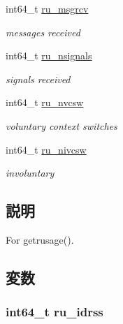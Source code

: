 \begin{DoxyCompactItemize}
int64\_\-t \hyperlink{structArmLinux64_1_1rusage_a76a1a216776ce4c8e99d59e12b94469d}{ru\_\-msgrcv}
\begin{DoxyCompactList}\small\item\em messages received \item\end{DoxyCompactList}\item 
int64\_\-t \hyperlink{structArmLinux64_1_1rusage_afafc5b85af3aa14ff03dc9051cd99803}{ru\_\-nsignals}
\begin{DoxyCompactList}\small\item\em signals received \item\end{DoxyCompactList}\item 
int64\_\-t \hyperlink{structArmLinux64_1_1rusage_a488b8289bbd360fe61edb0bc26ccdb4d}{ru\_\-nvcsw}
\begin{DoxyCompactList}\small\item\em voluntary context switches \item\end{DoxyCompactList}\item 
int64\_\-t \hyperlink{structArmLinux64_1_1rusage_ad6c040bd0a4bea27aac25d2b46398f13}{ru\_\-nivcsw}
\begin{DoxyCompactList}\small\item\em involuntary  \item\end{DoxyCompactList}\end{DoxyCompactItemize}


\subsection{説明}
For getrusage(). 

\subsection{変数}
\hypertarget{structArmLinux64_1_1rusage_a957d4290597d297f4fe76a7136182b75}{
\subsubsection[{ru\_\-idrss}]{\setlength{\rightskip}{0pt plus 5cm}int64\_\-t {\bf ru\_\-idrss}}}
\label{structArmLinux64_1_1rusage_a957d4290597d297f4fe76a7136182b75}


